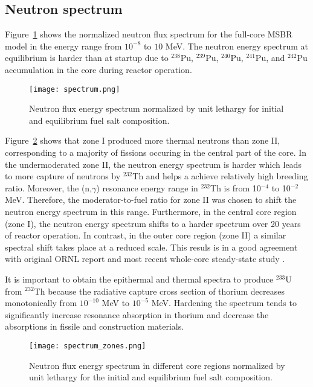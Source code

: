 \subsection{Neutron spectrum}
Figure~\ref{fig:spectrum} shows the normalized neutron flux spectrum for the 
full-core \gls{MSBR} model in the energy range from $10^{-8}$ to $10$ MeV. The 
neutron energy spectrum at equilibrium is harder than at startup due to 
$^{238}$Pu, $^{239}$Pu, $^{240}$Pu, $^{241}$Pu, and $^{242}$Pu accumulation in 
the core during reactor operation. 
\begin{figure}[ht!] %
  \centering
  \texttt{[image: spectrum.png]} 
  \caption{Neutron flux energy spectrum normalized by unit lethargy for initial 
and equilibrium fuel salt composition.}
  \label{fig:spectrum}
\end{figure}
Figure~\ref{fig:spectrum_zones} shows that zone I produced more thermal neutrons 
than zone II, corresponding to a majority of fissions occuring in the central 
part of the core. In the undermoderated zone II, the neutron energy spectrum is 
harder which leads to more capture of neutrons by $^{232}$Th and helps a achieve 
relatively high breeding ratio. Moreover, the (n,$\gamma$) resonance energy 
range in $^{232}$Th is from 10$^{-4}$ to 10$^{-2}$ MeV. Therefore, the 
moderator-to-fuel ratio for zone II was chosen to shift the neutron energy 
spectrum in this range. Furthermore, in the central core region (zone I), the 
neutron energy spectrum shifts to a harder spectrum over 20 years of reactor 
operation. In contrast, in the outer core region (zone II) a similar spectral 
shift takes place at a reduced scale. This resuls is in a good agreement with 
original ORNL report \cite{robertson_conceptual_1971} and most recent whole-core 
steady-state study \cite{park_whole_2015}.

It is important to obtain the epithermal and thermal spectra to produce 
$^{233}$U from $^{232}$Th because the radiative capture cross section of thorium 
decreases monotonically from $10^{-10}$ MeV to $10^{-5}$ MeV. Hardening the 
spectrum tends to significantly increase resonance absorption in thorium and 
decrease the absorptions in fissile and construction materials. 
\begin{figure}[ht!] %
  \centering
  \texttt{[image: spectrum\_zones.png]} 
  \caption{Neutron flux energy spectrum in different core regions normalized by 
unit lethargy for the initial and equilibrium fuel salt composition.}
  \label{fig:spectrum_zones}
\end{figure}


